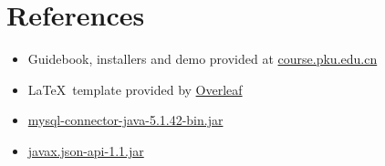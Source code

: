 \section{References}

\begin{itemize}
	\item Guidebook, installers and demo provided at \url{course.pku.edu.cn}
	\item \LaTeX \, template provided by \href{https://www.overleaf.com/latex/templates/project-template-titlepage/bwmhgfdvvhpw}{Overleaf}
	\item \href{https://dev.mysql.com/downloads/connector/j/}{mysql-connector-java-5.1.42-bin.jar}
	\item \href{https://mvnrepository.com/artifact/javax.json/javax.json-api/1.1}{javax.json-api-1.1.jar}
\end{itemize}


